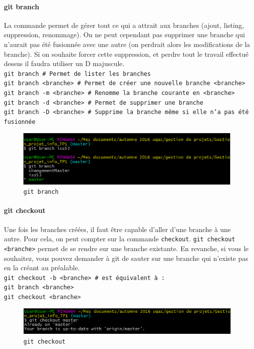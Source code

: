 \documentclass[11pt,canadien]{article}
\begin{document}
\paragraph{git branch}La commande permet de gérer tout ce qui a attrait aux branches (ajout, listing, suppression, renommage). On ne peut cependant  pas supprimer une branche qui n'aurait pas été fusionnée avec une autre (on perdrait alors les modifications de la branche). Si on souhaite forcer cette suppression, et perdre tout le travail effectué dessus il faudra utiliser un D majuscule. \\
\texttt{git branch               \# Permet de lister les branches \\
		git branch <branche>     \# Permet de créer une nouvelle branche <branche> \\
		git branch -m <branche>  \# Renomme la branche courante en <branche> \\
		git branch -d <branche>  \# Permet de supprimer une branche \\
		git branch -D <branche>  \# Supprime la branche même si elle n'a pas été fusionnée
}
\begin{figure}[h]
	\centering
	\includegraphics{images/git_branch.png}
	\caption{\texttt{git branch}}
	\label{fig:git_branch}
\end{figure}

\paragraph{git checkout}Une fois les branches créées, il faut être capable d'aller d'une branche à une autre. Pour cela, on peut compter sur la commande \texttt{checkout}. \texttt{git checkout <branche>} permet de se rendre sur une branche existante. En revanche, si vous le souhaitez, vous pouvez demander à git de sauter sur une branche qui n'existe pas en la créant au préalable. \\
\texttt{git checkout -b <branche> \# est équivalent à : \\
		git branch <branche> \\
		git checkout <branche>
}
\begin{figure}[h]
	\centering
	\includegraphics{images/git_checkout.png}
	\caption{\texttt{git checkout}}
	\label{fig:git_checkout}
\end{figure}
\end{document}
